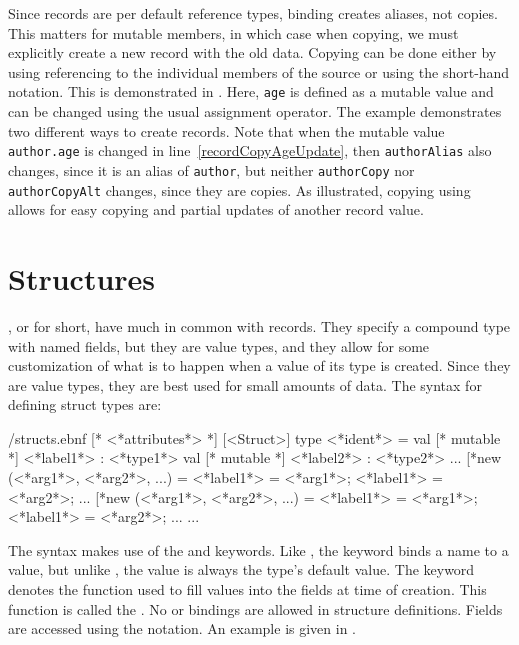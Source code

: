 Since records are per default reference types, binding creates aliases, not copies. This matters for mutable members, in which case when copying, we must explicitly create a new record with the old data. Copying can be done either by using referencing to the individual members of the source or using the short-hand  notation. This is demonstrated in .
%
%
Here, \lstinline{age} is defined as a mutable value and can be changed using the usual \lexeme{<-} assignment operator. The example demonstrates two different ways to create records. Note that when the mutable value \lstinline{author.age} is changed in line~\ref{recordCopyAgeUpdate}, then \lstinline{authorAlias} also changes, since it is an alias of \lstinline{author}, but neither \lstinline{authorCopy} nor \lstinline{authorCopyAlt} changes, since they are copies. As illustrated, copying using  allows for easy copying and partial updates of another record value.

\section{Structures}
\label{sec:structs}
, or  for short, have much in common with records. They specify a compound type with named fields, but they are value types, and they allow for some customization of what is to happen when a value of its type is created. Since they are value types, they are best used for small amounts of data. The syntax for defining struct types are:
%
\begin{verbatimwrite}{\ebnf/structs.ebnf}
[* <*attributes*> *] 
[<Struct>] 
type <*ident*> =
  val [* mutable *] <*label1*> : <*type1*>
  val [* mutable *] <*label2*> : <*type2*>
  ...
  [*new (<*arg1*>, <*arg2*>, ...) = {<*label1*> = <*arg1*>; <*label1*> = <*arg2*>; ...}
  [*new (<*arg1*>, <*arg2*>, ...) = {<*label1*> = <*arg1*>; <*label1*> = <*arg2*>; ...}
  ...
\end{verbatimwrite}
%
The syntax makes use of the  and  keywords. Like , the keyword  binds a name to a value, but unlike , the value is always the type's default value. The  keyword denotes the function used to fill values into the fields at time of creation. This function is called the . No  or  bindings are allowed in structure definitions. Fields are accessed using the  notation. An example is given in .
%
%


